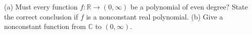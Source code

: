 (a) Must every function $f:\mathbb R\to(0,\infty)$ be a polynomial of even degree? State the correct conclusion if $f$ is a nonconstant real polynomial. (b) Give a nonconstant function from $\mathbb C$ to $(0,\infty)$.

